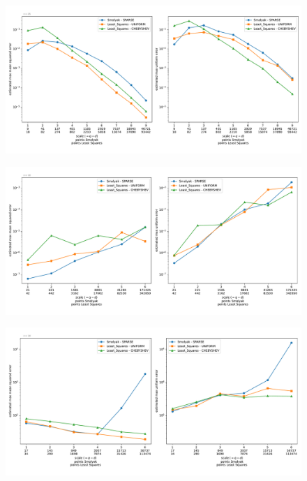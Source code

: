 \documentclass[12pt, oneside]{amsart}
\theoremstyle{definition}
\theoremstyle{remark}
\numberwithin{equation}{section}
\begin{document}

\begin{figure}[h]
	\centering
	\includegraphics[width=\linewidth]{figures/corner_peak/dim4/max_error_distribution_fixed_dim}
	\caption{}
	\label{fig:corner_peak_dim4}
\end{figure}

\begin{figure}[h]
	\centering
	\includegraphics[width=\linewidth]{figures/corner_peak/dim10/max_error_distribution_fixed_dim}
	\caption{}
	\label{fig:conrer_peak_dim10}
\end{figure}


\begin{figure}[h]
	\centering
	\includegraphics[width=\linewidth]{figures/discontinuous/dim8/max_error_distribution_fixed_dim}
	\caption{}
	\label{fig:discontinuous_dim8}
\end{figure}
\end{document}
